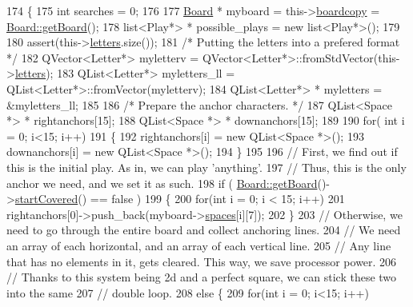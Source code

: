 \begin{DoxyCode}
174                                                 \{
175     \textcolor{keywordtype}{int} searches = 0;
176 
177     \hyperlink{class_board}{Board} * myboard = this->\hyperlink{class_a_i_player_a4262c0ef313e6ac9f3e5be3f2c4d6ade}{boardcopy} = \hyperlink{class_board_ae30e802b1d83309fc95e695b5b3df338}{Board::getBoard}();
178     list<Play*> * possible\_plays = \textcolor{keyword}{new} list<Play*>();
179 
180     assert(this->\hyperlink{class_player_abd40dc8f6d524bd1331a8133e9bb8902}{letters}.size());
181     \textcolor{comment}{/* Putting the letters into a prefered format */}
182     QVector<Letter*> myletterv = QVector<Letter*>::fromStdVector(this->\hyperlink{class_player_abd40dc8f6d524bd1331a8133e9bb8902}{letters});
183     QList<Letter*> myletters\_ll = QList<Letter*>::fromVector(myletterv);
184     QList<Letter*> * myletters = &myletters\_ll;
185 
186     \textcolor{comment}{/* Prepare the anchor characters. */}
187     QList<Space *> * rightanchors[15];
188     QList<Space *> * downanchors[15];
189 
190     \textcolor{keywordflow}{for}( \textcolor{keywordtype}{int} i = 0; i<15; i++)
191     \{
192         rightanchors[i] = \textcolor{keyword}{new} QList<Space *>();
193         downanchors[i] = \textcolor{keyword}{new} QList<Space *>();
194     \}
195 
196     \textcolor{comment}{// First, we find out if this is the initial play. As in, we can play 'anything'.}
197     \textcolor{comment}{// Thus, this is the only anchor we need, and we set it as such.}
198     \textcolor{keywordflow}{if} ( \hyperlink{class_board_ae30e802b1d83309fc95e695b5b3df338}{Board::getBoard}()->\hyperlink{class_board_a4a04a6fc41d20c9836b23826dc7f6026}{startCovered}() == false )
199     \{
200         \textcolor{keywordflow}{for}(\textcolor{keywordtype}{int} i = 0; i < 15; i++)
201             rightanchors[0]->push\_back(myboard->\hyperlink{class_board_a73b12248ddb6ee3adc24f4458d8661c2}{spaces}[i][7]);
202     \}
203     \textcolor{comment}{// Otherwise, we need to go through the entire board and collect anchoring lines.}
204     \textcolor{comment}{// We need an array of each horizontal, and an array of each vertical line.}
205     \textcolor{comment}{// Any line that has no elements in it, gets cleared. This way, we save processor power.}
206     \textcolor{comment}{// Thanks to this system being 2d and a perfect square, we can stick these two into the same}
207     \textcolor{comment}{// double loop.}
208     \textcolor{keywordflow}{else} \{
209         \textcolor{keywordflow}{for}(\textcolor{keywordtype}{int} i = 0; i<15; i++)

\end{DoxyCode}
